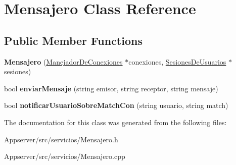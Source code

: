 \hypertarget{classMensajero}{}\section{Mensajero Class Reference}
\label{classMensajero}
\subsection*{Public Member Functions}
\begin{DoxyCompactItemize}
\item 
{\bfseries Mensajero} (\hyperlink{classManejadorDeConexiones}{Manejador\+De\+Conexiones} $\ast$conexiones, \hyperlink{classSesionesDeUsuarios}{Sesiones\+De\+Usuarios} $\ast$sesiones)\hypertarget{classMensajero_ac8f85b51bc31c39fe64e04d0fd07326e}{}\label{classMensajero_ac8f85b51bc31c39fe64e04d0fd07326e}

\item 
bool {\bfseries enviar\+Mensaje} (string emisor, string receptor, string mensaje)\hypertarget{classMensajero_a44f018371a6652717570ec1f003fc35a}{}\label{classMensajero_a44f018371a6652717570ec1f003fc35a}

\item 
bool {\bfseries notificar\+Usuario\+Sobre\+Match\+Con} (string usuario, string match)\hypertarget{classMensajero_a2df6b87ba2bc3c57200b2913d965a083}{}\label{classMensajero_a2df6b87ba2bc3c57200b2913d965a083}

\end{DoxyCompactItemize}


The documentation for this class was generated from the following files\+:\begin{DoxyCompactItemize}
\item 
Appserver/src/servicios/Mensajero.\+h\item 
Appserver/src/servicios/Mensajero.\+cpp\end{DoxyCompactItemize}
